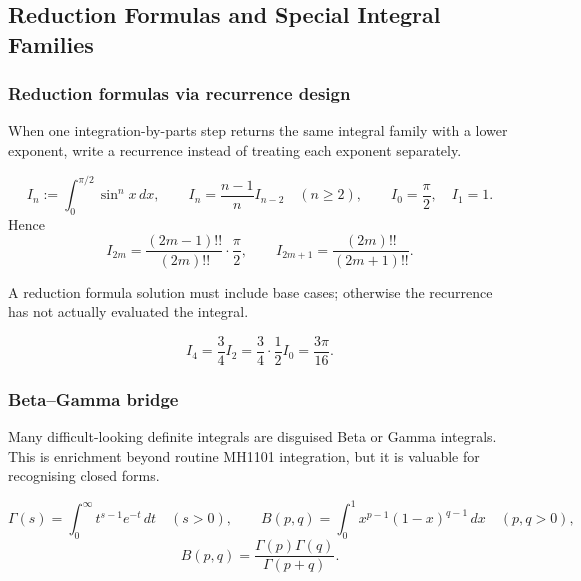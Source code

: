 \newpage
\subsection{Reduction Formulas and Special Integral Families}

\subsubsection{Reduction formulas via recurrence design}
\begin{extension}
When one integration-by-parts step returns the same integral family with a lower
exponent, write a recurrence instead of treating each exponent separately.
\end{extension}

\begin{keyformula}[title={Wallis Sine-Power Recurrence}]
\[
I_n:=\int_0^{\pi/2}\sin^n x\,dx,
\qquad
I_n=\frac{n-1}{n}I_{n-2}\quad(n\ge2),
\qquad
I_0=\frac\pi2,
\quad I_1=1.
\]
Hence
\[
I_{2m}=\frac{(2m-1)!!}{(2m)!!}\cdot\frac\pi2,
\qquad
I_{2m+1}=\frac{(2m)!!}{(2m+1)!!}.
\]
\end{keyformula}

\begin{examtip}
A reduction formula solution must include base cases; otherwise the recurrence
has not actually evaluated the integral.
\end{examtip}

\begin{examplebox}[title={Using the Recurrence}]
\[
I_4=\frac34 I_2=\frac34\cdot\frac12 I_0=\frac{3\pi}{16}.
\]
\end{examplebox}

\newpage
\subsubsection{Beta--Gamma bridge}
\begin{extension}
Many difficult-looking definite integrals are disguised Beta or Gamma integrals.
This is enrichment beyond routine MH1101 integration, but it is valuable for
recognising closed forms.
\end{extension}

\begin{keyformula}[title={Beta and Gamma Functions}]
\[
\Gamma(s)=\int_0^\infty t^{s-1}e^{-t}\,dt\quad(s>0),
\qquad
B(p,q)=\int_0^1x^{p-1}(1-x)^{q-1}\,dx\quad(p,q>0),
\]
\[
B(p,q)=\frac{\Gamma(p)\Gamma(q)}{\Gamma(p+q)}.
\]
\end{keyformula}

